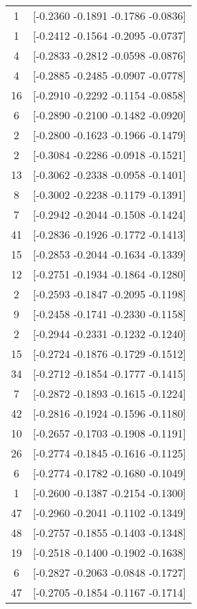 \documentclass[12pt, fullpage,letterpaper]{article}
\begin{document}
\begin{enumerate}
\begin{enumerate}
{\begin{longtable}{|c|c|}
			  1 &  [-0.2360 -0.1891 -0.1786 -0.0836] \\
			  1 &  [-0.2412 -0.1564 -0.2095 -0.0737] \\
			  4 &  [-0.2833 -0.2812 -0.0598 -0.0876] \\
			  4 &  [-0.2885 -0.2485 -0.0907 -0.0778] \\
			 16 &  [-0.2910 -0.2292 -0.1154 -0.0858] \\
			  6 &  [-0.2890 -0.2100 -0.1482 -0.0920] \\
			  2 &  [-0.2800 -0.1623 -0.1966 -0.1479] \\
			  2 &  [-0.3084 -0.2286 -0.0918 -0.1521] \\
			 13 &  [-0.3062 -0.2338 -0.0958 -0.1401] \\
			  8 &  [-0.3002 -0.2238 -0.1179 -0.1391] \\
			  7 &  [-0.2942 -0.2044 -0.1508 -0.1424] \\
			 41 &  [-0.2836 -0.1926 -0.1772 -0.1413] \\
			 15 &  [-0.2853 -0.2044 -0.1634 -0.1339] \\
			 12 &  [-0.2751 -0.1934 -0.1864 -0.1280] \\
			  2 &  [-0.2593 -0.1847 -0.2095 -0.1198] \\
			  9 &  [-0.2458 -0.1741 -0.2330 -0.1158] \\
			  2 &  [-0.2944 -0.2331 -0.1232 -0.1240] \\
			 15 &  [-0.2724 -0.1876 -0.1729 -0.1512] \\
			 34 &  [-0.2712 -0.1854 -0.1777 -0.1415] \\
			  7 &  [-0.2872 -0.1893 -0.1615 -0.1224] \\
			 42 &  [-0.2816 -0.1924 -0.1596 -0.1180] \\
			 10 &  [-0.2657 -0.1703 -0.1908 -0.1191] \\
			 26 &  [-0.2774 -0.1845 -0.1616 -0.1125] \\
			  6 &  [-0.2774 -0.1782 -0.1680 -0.1049] \\
			  1 &  [-0.2600 -0.1387 -0.2154 -0.1300] \\
			 47 &  [-0.2960 -0.2041 -0.1102 -0.1349] \\
			 48 &  [-0.2757 -0.1855 -0.1403 -0.1348] \\
			 19 &  [-0.2518 -0.1400 -0.1902 -0.1638] \\
			  6 &  [-0.2827 -0.2063 -0.0848 -0.1727] \\
			 47 &  [-0.2705 -0.1854 -0.1167 -0.1714] \\

\end{longtable}}
\end{enumerate}
\end{enumerate}
\end{document}
